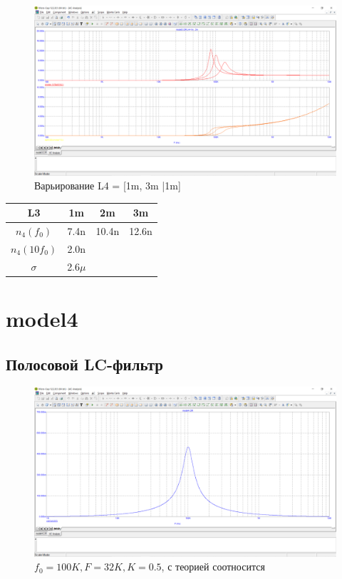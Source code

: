 \documentclass[a4paper, 12pt]{article}%
\begin{document}
\begin{figure}[h!]
    \centering
    \includegraphics[scale = 0.4 \textwidth]{images/mod3_4_2_3.png}
    \caption{Варьирование L4 = [1m, 3m |1m]}
    \label{fig:m3423}
\end{figure}

\begin{tabular}{|c|c|c|c|}
    L3 & 1m & 2m & 3m\\ \hline
    $n_4(f_0)$ & 7.4n & 10.4n & 12.6n\\ \hline
    $n_4(10 f_0)$ & 2.0n &  & \\ \hline
    $\sigma$ & 2.6$\mu$ &  & \\ \hline
\end{tabular}

\section{\textbf{model4}}

\subsection{Полосовой LC-фильтр}
\FloatBarrier
\begin{figure}[h!]
    \centering
    \includegraphics[scale = 0.4 \textwidth]{images/mod4_1_1.png}
    \caption{$f_0 = 100K, F = 32K, K = 0.5$, с теорией соотносится}
    \label{fig:m411}
\end{figure}
\end{document}
